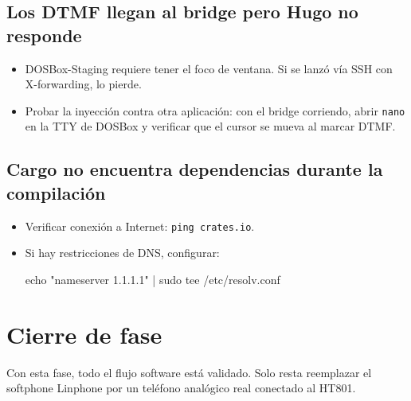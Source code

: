 \subsection{Los DTMF llegan al bridge pero Hugo no responde}

\begin{itemize}
  \item DOSBox-Staging requiere tener el foco de ventana. Si se lanzó vía SSH con X-forwarding, lo pierde.
  \item Probar la inyección contra otra aplicación: con el bridge corriendo, abrir \texttt{nano} en la TTY de DOSBox y verificar que el cursor se mueva al marcar DTMF.
\end{itemize}

\subsection{Cargo no encuentra dependencias durante la compilación}

\begin{itemize}
  \item Verificar conexión a Internet: \texttt{ping crates.io}.
  \item Si hay restricciones de DNS, configurar:
  \begin{shellcode}
echo "nameserver 1.1.1.1" | sudo tee /etc/resolv.conf
  \end{shellcode}
\end{itemize}

\section{Cierre de fase}

Con esta fase, todo el flujo software está validado. Solo resta reemplazar el softphone Linphone por un teléfono analógico real conectado al HT801.
